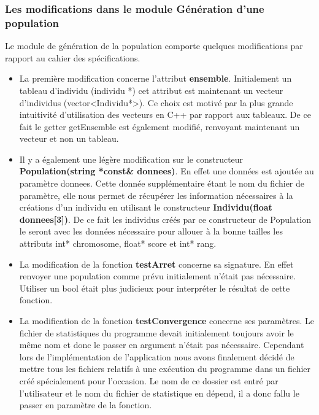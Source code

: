 \documentclass[a4paper,11pt]{article}
\begin{document}
   			\subsubsection{Les modifications dans le module Génération d’une population}
   				Le module de génération de la population comporte quelques modifications par rapport au cahier des spécifications.\\
   				\begin{itemize}
   					\item La première modification concerne l’attribut  \textbf{ensemble}. Initialement un tableau d’individu (individu *) cet attribut est maintenant un vecteur d’individus (vector<Individu*>). Ce choix est motivé par la plus grande intuitivité d’utilisation des vecteurs en C++ par rapport aux tableaux. De ce fait le getter getEnsemble est également modifié, renvoyant maintenant un vecteur et non un tableau.

   					\item Il y a également une légère modification sur le constructeur  \textbf{Population(string *const\& donnees)}. En effet une données est ajoutée au paramètre donnees. Cette donnée supplémentaire étant le nom du fichier de paramètre, elle nous permet de récupérer les information nécessaires à la créations d’un individu en utilisant le constructeur  \textbf{Individu(float donnees[3])}. De ce fait les individus créés par ce constructeur de Population le seront avec les données nécessaire pour allouer à la bonne tailles les attributs int* chromosome, float* score et int* rang.

   					\item La modification de la fonction  \textbf{testArret} concerne sa signature. En effet renvoyer une population comme prévu initialement n’était pas nécessaire. Utiliser un bool était plus judicieux pour interpréter le résultat de cette fonction.

   					\item La modification de la fonction  \textbf{testConvergence} concerne ses paramètres. Le fichier de statistiques du programme devait initialement toujours avoir le même nom et donc le passer en argument n’était pas nécessaire. Cependant lors de l’implémentation de l'application nous avons finalement décidé de mettre tous les fichiers relatifs à une exécution du programme dans un fichier créé spécialement pour l’occasion. Le nom de ce dossier est entré par l’utilisateur et le nom du fichier de statistique en dépend, il a donc fallu le passer en paramètre de la fonction.


\end{itemize}
\end{document}
